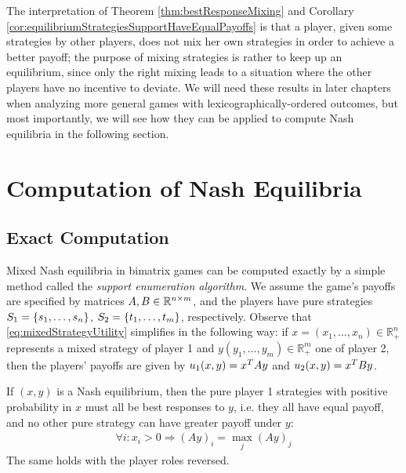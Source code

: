 \documentclass[a4paper]{scrreprt}
\newcommand{\Rp}{\mathbb{R}_+}
\begin{document}
    The interpretation of Theorem \ref{thm:bestResponseMixing} and Corollary \ref{cor:equilibriumStrategiesSupportHaveEqualPayoffs} is that a player, given some strategies by other players, does not mix her own strategies in order to achieve a better payoff; the purpose of mixing strategies is rather to keep up an equilibrium, since only the right mixing leads to a situation where the other players have no incentive to deviate.
    We will need these results in later chapters when analyzing more general games with lexicographically-ordered outcomes, but most importantly, we will see how they can be applied to compute Nash equilibria in the following section.
    
    \section{Computation of Nash Equilibria}
    
    \subsection{Exact Computation}
    Mixed Nash equilibria in bimatrix games can be computed exactly by a simple method called the \emph{support enumeration algorithm}.
    We assume the game's payoffs are specified by matrices $A, B \in \mathbb{R}^{n\times m}$, and the players have pure strategies $S_1 = \{s_1,\dots,s_n\}$, $S_2 = \{t_1,\dots,t_m\}$, respectively.
    Observe that \eqref{eq:mixedStrategyUtility} simplifies in the following way: if $x = (x_1,\dots,x_n) \in \Rp^n$ represents a mixed strategy of player 1 and $y (y_1,\dots,y_m) \in \Rp^m$ one of player 2, then the players' payoffs are given by $u_1(x,y) = x^{T} A y$ and $u_2(x,y) = x^{T} B y$. 
    
    
    
    
    
    If $(x, y)$ is a Nash equilibrium, then the pure player 1 strategies with positive probability in $x$ must all be best responses to $y$, i.e. they all have equal payoff, and no other pure strategy can have greater payoff under $y$:
    \begin{gather}
        \forall i: x_i > 0 \Rightarrow (Ay)_i = \max_{j} (Ay)_j
        \label{eq:equalMaxPureStrategyPayoffsLinearSystem}
    \end{gather}
    The same holds with the player roles reversed.
    
\end{document}
